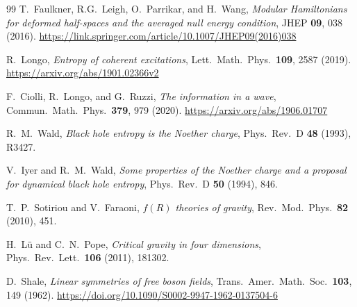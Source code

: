 \documentclass[11pt,a4paper]{article}
\theoremstyle{plain}
\theoremstyle{definition}
\begin{document}
\begin{thebibliography}{99}
T.~Faulkner, R.G.~Leigh, O.~Parrikar, and H.~Wang,
\emph{Modular Hamiltonians for deformed half-spaces and the averaged null
energy condition},
JHEP \textbf{09}, 038 (2016). \url{https://link.springer.com/article/10.1007/JHEP09(2016)038}

R.~Longo,
\emph{Entropy of coherent excitations},
Lett.\ Math.\ Phys.\ \textbf{109}, 2587 (2019). \url{https://arxiv.org/abs/1901.02366v2}

F.~Ciolli, R.~Longo, and G.~Ruzzi,
\emph{The information in a wave},
Commun.\ Math.\ Phys.\ \textbf{379}, 979 (2020). \url{https://arxiv.org/abs/1906.01707}

R.~M.~Wald,
\emph{Black hole entropy is the Noether charge},
Phys.\ Rev.\ D \textbf{48} (1993), R3427.

V.~Iyer and R.~M.~Wald,
\emph{Some properties of the Noether charge and a proposal for dynamical
black hole entropy},
Phys.\ Rev.\ D \textbf{50} (1994), 846.

T.~P.~Sotiriou and V.~Faraoni,
\emph{$f(R)$ theories of gravity},
Rev.\ Mod.\ Phys.\ \textbf{82} (2010), 451.

H.~L\"u and C.~N.~Pope,
\emph{Critical gravity in four dimensions},
Phys.\ Rev.\ Lett.\ \textbf{106} (2011), 181302.

D.~Shale,
\emph{Linear symmetries of free boson fields},
Trans.\ Amer.\ Math.\ Soc.\ \textbf{103}, 149 (1962). \url{https://doi.org/10.1090/S0002-9947-1962-0137504-6}

\end{thebibliography}
\end{document}

